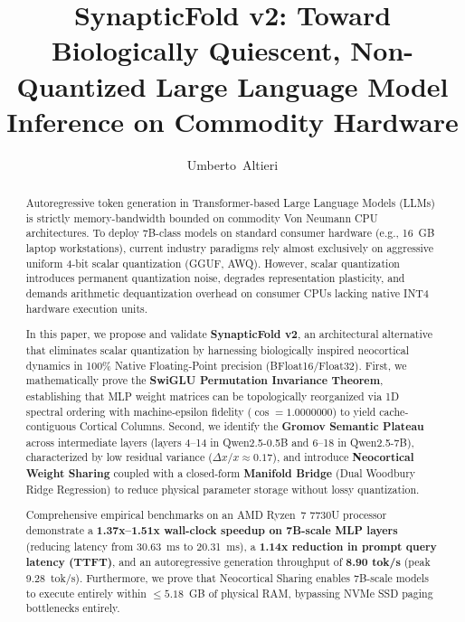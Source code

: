 \documentclass[10pt,journal,compsoc]{IEEEtran}
\theoremstyle{definition}
\begin{document}
\title{SynapticFold v2: Toward Biologically Quiescent, Non-Quantized Large Language Model Inference on Commodity Hardware}

\author{Umberto~Altieri\\
}

\maketitle

\begin{abstract}
Autoregressive token generation in Transformer-based Large Language Models (LLMs) is strictly memory-bandwidth bounded on commodity Von Neumann CPU architectures. To deploy 7B-class models on standard consumer hardware (e.g., 16~GB laptop workstations), current industry paradigms rely almost exclusively on aggressive uniform 4-bit scalar quantization (GGUF, AWQ). However, scalar quantization introduces permanent quantization noise, degrades representation plasticity, and demands arithmetic dequantization overhead on consumer CPUs lacking native INT4 hardware execution units.

In this paper, we propose and validate \textbf{SynapticFold v2}, an architectural alternative that eliminates scalar quantization by harnessing biologically inspired neocortical dynamics in 100\% Native Floating-Point precision (BFloat16/Float32). First, we mathematically prove the \textbf{SwiGLU Permutation Invariance Theorem}, establishing that MLP weight matrices can be topologically reorganized via 1D spectral ordering with machine-epsilon fidelity ($\cos = 1.0000000$) to yield cache-contiguous Cortical Columns. Second, we identify the \textbf{Gromov Semantic Plateau} across intermediate layers (layers 4--14 in Qwen2.5-0.5B and 6--18 in Qwen2.5-7B), characterized by low residual variance ($\Delta x / x \approx 0.17$), and introduce \textbf{Neocortical Weight Sharing} coupled with a closed-form \textbf{Manifold Bridge} (Dual Woodbury Ridge Regression) to reduce physical parameter storage without lossy quantization.

Comprehensive empirical benchmarks on an AMD Ryzen~7 7730U processor demonstrate a \textbf{1.37x--1.51x wall-clock speedup on 7B-scale MLP layers} (reducing latency from 30.63~ms to 20.31~ms), a \textbf{1.14x reduction in prompt query latency (TTFT)}, and an autoregressive generation throughput of \textbf{8.90 tok/s} (peak 9.28~tok/s). Furthermore, we prove that Neocortical Sharing enables 7B-scale models to execute entirely within $\le 5.18$~GB of physical RAM, bypassing NVMe SSD paging bottlenecks entirely.
\end{abstract}
\end{document}
